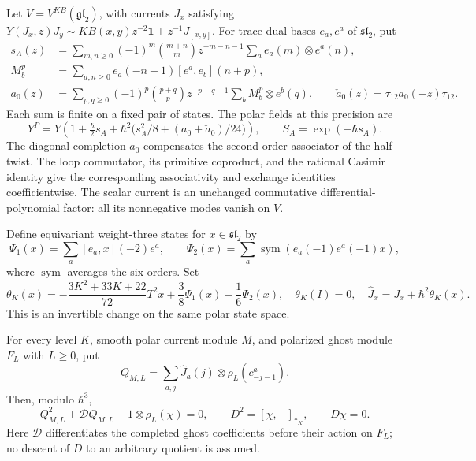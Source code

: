 Let $V=V^{KB}(\mathfrak{gl}_2)$, with currents $J_x$ satisfying
$Y(J_x,z)J_y\sim KB(x,y)z^{-2}\mathbf1+z^{-1}J_{[x,y]}$.
For trace-dual bases $e_a,e^a$ of $\mathfrak{sl}_2$, put
\[
 \begin{aligned}
 s_A(z)&=\sum_{m,n\geq0}(-1)^m\binom{m+n}{m}z^{-m-n-1}
                          \sum_a e_a(m)\otimes e^a(n),\\
 M_b^p&=\sum_{a,n\geq0}e_a(-n-1)[e^a,e_b](n+p),\\
 a_0(z)&=\sum_{p,q\geq0}(-1)^p\binom{p+q}{p}z^{-p-q-1}
                          \sum_bM_b^p\otimes e^b(q),\qquad
 \check a_0(z)=\tau_{12}a_0(-z)\tau_{12}.
 \end{aligned}
\]
Each sum is finite on a fixed pair of states.  The polar fields at
this precision are
\begin{equation}\label{cyquant:eq:polar-current}
 Y^P=Y\left(1+\tfrac\hbar2s_A+
       \hbar^2\bigl(s_A^2/8+(a_0+\check a_0)/24\bigr)\right),
 \qquad S_A=\exp(-\hbar s_A).
\end{equation}
The diagonal completion $a_0$ compensates the second-order
associator of the half twist.  The loop commutator, its primitive
coproduct, and the rational Casimir identity give the corresponding
associativity and exchange identities coefficientwise.  The scalar
current is an unchanged commutative differential-polynomial factor:
all its nonnegative modes vanish on $V$.

Define equivariant weight-three states for $x\in\mathfrak{sl}_2$ by
\[
 \Psi_1(x)=\sum_a[e_a,x](-2)e^a,
 \qquad
 \Psi_2(x)=\sum_a\operatorname{sym}(e_a(-1)e^a(-1)x),
\]
where $\operatorname{sym}$ averages the six orders.  Set
\begin{equation}\label{cyquant:eq:current-change}
 \theta_K(x)=-\frac{3K^2+33K+22}{72}T^2x
                  +\frac38\Psi_1(x)-\frac16\Psi_2(x),
 \quad \theta_K(I)=0,
 \quad \widehat J_x=J_x+\hbar^2\theta_K(x).
\end{equation}
This is an invertible change on the same polar state space.

\begin{theorem}\label{cyquant:thm:all-mode-mc}
For every level $K$, smooth polar current module $M$, and polarized
ghost module $F_L$ with $L\geq0$, put
\[
 Q_{M,L}=\sum_{a,j}\widehat J_a(j)\otimes\rho_L(c^a_{-j-1}).
\]
Then, modulo $\hbar^3$,
\begin{equation}\label{cyquant:eq:all-mode-mc}
 Q_{M,L}^2+\mathcal DQ_{M,L}+1\otimes\rho_L(\chi)=0,
 \qquad D^2=[\chi,-]_{*_K},\qquad D\chi=0.
\end{equation}
Here $\mathcal D$ differentiates the completed ghost coefficients
before their action on $F_L$; no descent of $D$ to an arbitrary
quotient is assumed.
\end{theorem}

